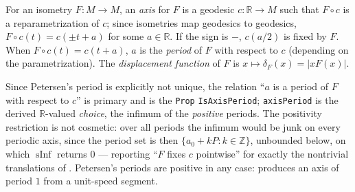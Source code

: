 \begin{definition}
  \label{def:pet-ch6-axis-displacement}
  \leanok
  For an isometry $F:M\to M$, an \emph{axis} for $F$ is a geodesic
  $c:\mathbb{R}\to M$ such that $F\circ c$ is a reparametrization of $c$; since
  isometries map geodesics to geodesics, $F\circ c(t)=c(\pm t+a)$ for some
  $a\in\mathbb{R}$. If the sign is $-$, $c(a/2)$ is fixed by $F$. When
  $F\circ c(t)=c(t+a)$, $a$ is the \emph{period} of $F$ with respect to $c$
  (depending on the parametrization). The \emph{displacement function} of $F$
  is $x\mapsto\delta_F(x)=|xF(x)|$.

  Since Petersen's period is explicitly not unique, the relation
  ``$a$ is a period of $F$ with respect to $c$'' is primary and is the
  \texttt{Prop} \texttt{IsAxisPeriod}; \texttt{axisPeriod} is the
  derived $\mathbb{R}$-valued \emph{choice}, the infimum of the
  \emph{positive} periods. The positivity restriction is not cosmetic: over all
  periods the infimum would be junk on every periodic axis, since the period
  set is then $\{a_0+kP:k\in\mathbb{Z}\}$, unbounded below, on which
  $\operatorname{sInf}$ returns $0$ --- reporting ``$F$ fixes $c$ pointwise''
  for exactly the nontrivial translations of .
  Petersen's periods are positive in any case: 
  produces an axis of period $1$ from a unit-speed segment.
\end{definition}

